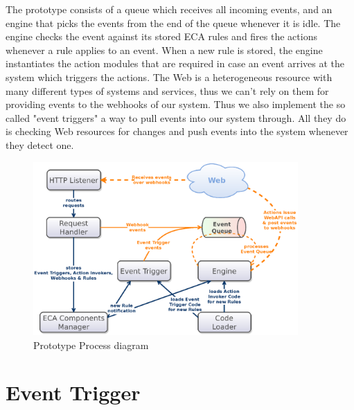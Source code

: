 The prototype consists of a queue which receives all incoming events, and an engine that picks the events from the end of the queue whenever it is idle.
The engine checks the event against its stored ECA rules and fires the actions whenever a rule applies to an event.
When a new rule is stored, the engine instantiates the action modules that are required in case an event arrives at the system which triggers the actions.
The Web is a heterogeneous resource with many different types of systems and services, thus we can't rely on them for providing events to the webhooks of our system.
Thus we also implement the so called "event triggers" a way to pull events into our system through.
All they do is checking Web resources for changes and push events into the system whenever they detect one.
\begin{figure}[!ht]
	\centering
  \includegraphics[width=0.9\textwidth]{figures/Architecture_wET}
	\caption{Prototype Process diagram}
	\label{fig:Architecture_wET}
\end{figure}


\section{Event Trigger}




%


